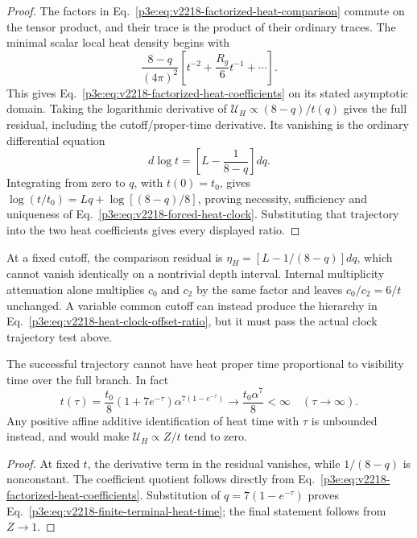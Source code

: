 \documentclass[12pt,a4paper]{article}
\begin{document}
\begin{proof}
The factors in Eq.~\eqref{p3e:eq:v2218-factorized-heat-comparison}
commute on the tensor product, and their trace is the product of their
ordinary traces.  The minimal scalar local heat density begins with
\[
 \frac{8-q}{(4\pi)^2}
 \left[t^{-2}+\frac{R_g}{6}t^{-1}+\cdots\right].
\]
This gives Eq.~\eqref{p3e:eq:v2218-factorized-heat-coefficients}
on its stated asymptotic domain.  Taking the logarithmic derivative
of \(\mathcal U_H\propto(8-q)/t(q)\) gives the full residual,
including the cutoff/proper-time derivative.  Its vanishing is the
ordinary differential equation
\[
 d\log t=\left[L-\frac1{8-q}\right]dq.
\]
Integrating from zero to \(q\), with \(t(0)=t_0\), gives
\(\log(t/t_0)=Lq+\log[(8-q)/8]\), proving necessity,
sufficiency and uniqueness of
Eq.~\eqref{p3e:eq:v2218-forced-heat-clock}.  Substituting that
trajectory into the two heat coefficients gives every displayed
ratio.
\end{proof}

\begin{corollary}
\label{p3e:cor:v2218-distinct-heat-visibility-clocks}
At a fixed cutoff, the comparison residual is
\(\eta_H=[L-1/(8-q)]dq\), which cannot vanish identically on a
nontrivial depth interval.  Internal multiplicity attenuation alone
multiplies \(c_0\) and \(c_2\) by the same factor and leaves
\(c_0/c_2=6/t\) unchanged.  A variable common cutoff can instead
produce the hierarchy in
Eq.~\eqref{p3e:eq:v2218-heat-clock-offset-ratio}, but it must pass
the actual clock trajectory test above.

The successful trajectory cannot have heat proper time proportional
to visibility time over the full branch.  In fact
\begin{equation}
 \label{p3e:eq:v2218-finite-terminal-heat-time}
 t(\tau)=\frac{t_0}{8}(1+7e^{-\tau})
 \alpha^{7(1-e^{-\tau})}
 \longrightarrow\frac{t_0\alpha^7}{8}<\infty
 \quad(\tau\longrightarrow\infty).
\end{equation}
Any positive affine additive identification of heat time with
\(\tau\) is unbounded instead, and would make
\(\mathcal U_H\propto Z/t\) tend to zero.
\end{corollary}
\begin{proof}
At fixed \(t\), the derivative term in the residual vanishes, while
\(1/(8-q)\) is nonconstant.  The coefficient quotient follows
directly from Eq.~\eqref{p3e:eq:v2218-factorized-heat-coefficients}.
Substitution of \(q=7(1-e^{-\tau})\) proves
Eq.~\eqref{p3e:eq:v2218-finite-terminal-heat-time}; the final
statement follows from \(Z\to1\).
\end{proof}
\end{document}
